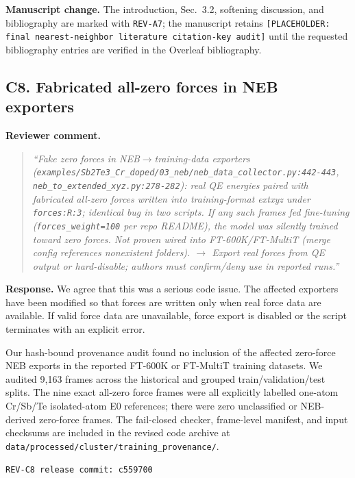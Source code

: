 \documentclass[11pt,a4paper]{article}
\begin{document}
\noindent\textbf{Manuscript change.}
The introduction, Sec.~3.2, softening discussion, and bibliography are marked with \texttt{REV-A7}; the manuscript retains \texttt{[PLACEHOLDER: final nearest-neighbor literature citation-key audit]} until the requested bibliography entries are verified in the Overleaf bibliography.

\subsection*{C8. Fabricated all-zero forces in NEB exporters}

\noindent\textbf{Reviewer comment.}
\begin{quote}
\itshape
``Fake zero forces in NEB$\rightarrow$training-data exporters (\texttt{examples/Sb2Te3\_Cr\_doped/03\_neb/neb\_data\_collector.py:442-443}, \texttt{neb\_to\_extended\_xyz.py:278-282}): real QE energies paired with fabricated all-zero forces written into training-format extxyz under \texttt{forces:R:3}; identical bug in two scripts. If any such frames fed fine-tuning (\texttt{forces\_weight=100} per repo README), the model was silently trained toward zero forces. Not proven wired into FT-600K/FT-MultiT (merge config references nonexistent folders). $\rightarrow$ Export real forces from QE output or hard-disable; authors must confirm/deny use in reported runs.''
\end{quote}

\noindent\textbf{Response.}
We agree that this was a serious code issue. The affected exporters have been modified so that forces are written only when real force data are available. If valid force data are unavailable, force export is disabled or the script terminates with an explicit error.

Our hash-bound provenance audit found no inclusion of the affected zero-force NEB exports in the reported FT-600K or FT-MultiT training datasets. We audited 9,163 frames across the historical and grouped train/validation/test splits. The nine exact all-zero force frames were all explicitly labelled one-atom Cr/Sb/Te isolated-atom E0 references; there were zero unclassified or NEB-derived zero-force frames. The fail-closed checker, frame-level manifest, and input checksums are included in the revised code archive at \texttt{data/processed/cluster/training\_provenance/}.

\begin{center}
\texttt{REV-C8 release commit: c559700}
\end{center}
\end{document}
